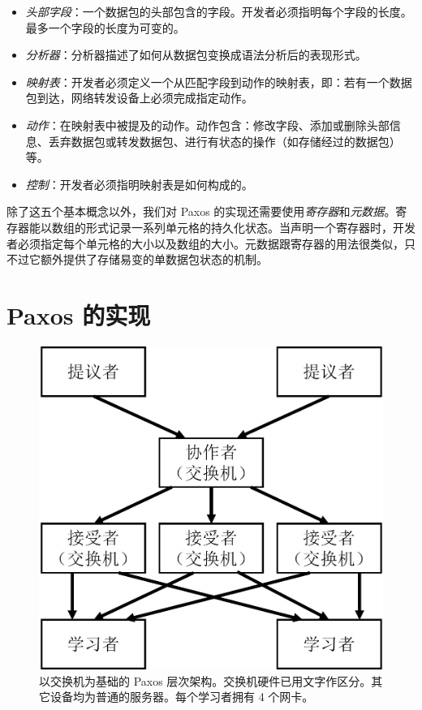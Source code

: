 \documentclass[conference]{IEEEtran}
\begin{document}
\begin{itemize}
\item \emph{头部字段}：一个数据包的头部包含的字段。开发者必须指明每个字段的长度。最多一个字段的长度为可变的。
\item \emph{分析器}：分析器描述了如何从数据包变换成语法分析后的表现形式。
\item \emph{映射表}：开发者必须定义一个从匹配字段到动作的映射表，即：若有一个数据包到达，网络转发设备上必须完成指定动作。
\item \emph{动作}：在映射表中被提及的动作。动作包含：修改字段、添加或删除头部信息、丢弃数据包或转发数据包、进行有状态的操作（如存储经过的数据包）等。
\item \emph{控制}：开发者必须指明映射表是如何构成的。
\end{itemize}

除了这五个基本概念以外，我们对 Paxos 的实现还需要使用\emph{寄存器}和\emph{元数据}。寄存器能以数组的形式记录一系列单元格的持久化状态。当声明一个寄存器时，开发者必须指定每个单元格的大小以及数组的大小。元数据跟寄存器的用法很类似，只不过它额外提供了存储易变的单数据包状态的机制。

\section{Paxos 的实现}

\begin{figure}
\centering
\includegraphics[scale=0.4]{img/image2.png}
\caption{以交换机为基础的 Paxos 层次架构。交换机硬件已用文字作区分。其它设备均为普通的服务器。每个学习者拥有 4 个网卡。}
\label{l2}
\end{figure}
\end{document}
